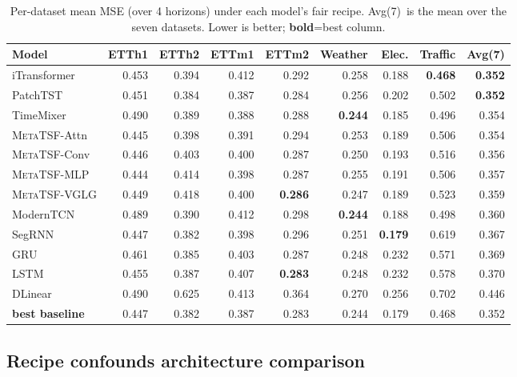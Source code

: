 \documentclass[11pt]{article}
\newcommand{\best}[1]{\textbf{#1}}
\newcommand{\mtsf}{\textsc{MetaTSF}}
\newcommand{\vglg}{\textsc{VGLG}}
\newcommand{\avgseven}{Avg(7)}
\begin{document}
\begin{table}[t]
\centering
\caption{Per-dataset mean MSE (over 4 horizons) under each model's fair recipe.
\avgseven\ is the mean over the seven datasets. Lower is better; \best{bold}=best column.}
\label{tab:main}
\small
\setlength{\tabcolsep}{4pt}
\begin{tabular}{@{}lrrrrrrrr@{}}
\toprule
Model & ETTh1 & ETTh2 & ETTm1 & ETTm2 & Weather & Elec. & Traffic & \avgseven \\
\midrule
iTransformer  & 0.453 & 0.394 & 0.412 & 0.292 & 0.258 & 0.188 & \best{0.468} & \best{0.352}\\
PatchTST      & 0.451 & 0.384 & 0.387 & 0.284 & 0.256 & 0.202 & 0.502 & \best{0.352}\\
TimeMixer     & 0.490 & 0.389 & 0.388 & 0.288 & \best{0.244} & 0.185 & 0.496 & 0.354\\
\mtsf-Attn    & 0.445 & 0.398 & 0.391 & 0.294 & 0.253 & 0.189 & 0.506 & 0.354\\
\mtsf-Conv    & 0.446 & 0.403 & 0.400 & 0.287 & 0.250 & 0.193 & 0.516 & 0.356\\
\mtsf-MLP     & 0.444 & 0.414 & 0.398 & 0.287 & 0.255 & 0.191 & 0.506 & 0.357\\
\mtsf-\vglg   & 0.449 & 0.418 & 0.400 & \best{0.286} & 0.247 & 0.189 & 0.523 & 0.359\\
ModernTCN     & 0.489 & 0.390 & 0.412 & 0.298 & \best{0.244} & 0.188 & 0.498 & 0.360\\
SegRNN        & 0.447 & 0.382 & 0.398 & 0.296 & 0.251 & \best{0.179} & 0.619 & 0.367\\
GRU           & 0.461 & 0.385 & 0.403 & 0.287 & 0.248 & 0.232 & 0.571 & 0.369\\
LSTM          & 0.455 & 0.387 & 0.407 & \best{0.283} & 0.248 & 0.232 & 0.578 & 0.370\\
DLinear       & 0.490 & 0.625 & 0.413 & 0.364 & 0.270 & 0.256 & 0.702 & 0.446\\
\midrule
\best{best baseline} & 0.447 & 0.382 & 0.387 & 0.283 & 0.244 & 0.179 & 0.468 & 0.352\\
\bottomrule
\end{tabular}
\end{table}

\subsection{Recipe confounds architecture comparison}
\end{document}
